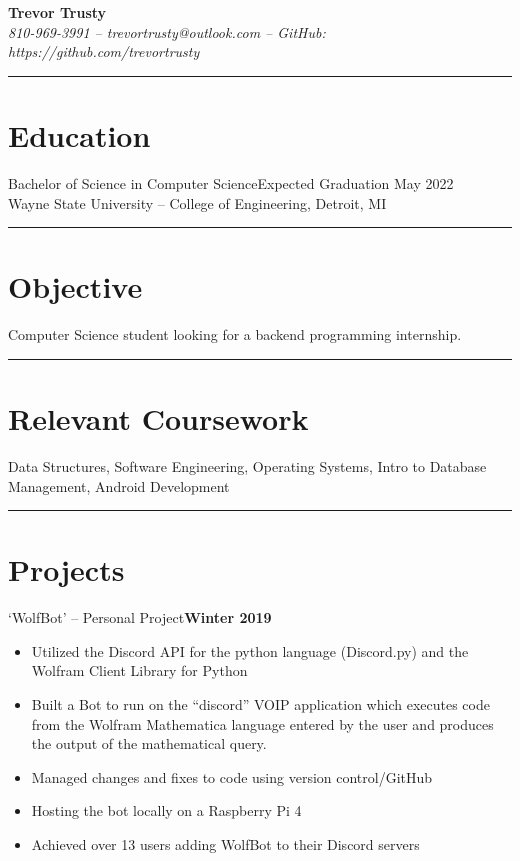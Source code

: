 \documentclass[10pt]{article}
\begin{document}
\begin{center}
\textbf{\huge{Trevor Trusty}} \\
\vspace{.25em}
\em{810-969-3991 -- trevortrusty@outlook.com -- GitHub: https://github.com/trevortrusty}
\end{center}
\noindent\rule{\textwidth}{.5pt}


\section{Education}
Bachelor of Science in Computer Science\hfill Expected Graduation May 2022\\
Wayne State University – College of Engineering, Detroit, MI\\
\noindent\rule{\textwidth}{.5pt}


\section{Objective}
Computer Science student looking for a backend programming internship.


\noindent\rule{\textwidth}{.5pt}
\section{Relevant Coursework}
Data Structures, Software Engineering, Operating Systems, Intro to Database Management, Android Development

\noindent\rule{\textwidth}{.5pt}
\section{Projects}
‘WolfBot’ – Personal Project\hfill \textbf{Winter 2019}
\begin{itemize}
	\item Utilized the Discord API for the python language (Discord.py) and the Wolfram Client Library for Python
	\item Built a Bot to run on the “discord” VOIP application which executes code from the Wolfram Mathematica language entered by the user and produces the output of the mathematical query.
	\item Managed changes and fixes to code using version control/GitHub
	\item Hosting the bot locally on a Raspberry Pi 4
	\item Achieved over 13 users adding WolfBot to their Discord servers
\end{itemize}
\end{document}
